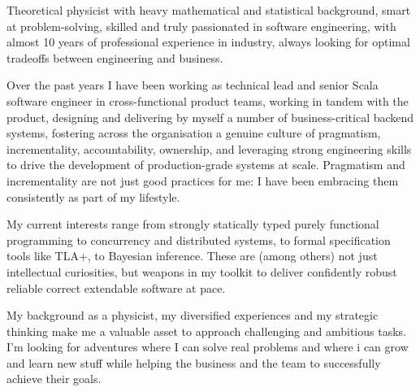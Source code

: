 
\begin{cvparagraph}
Theoretical physicist with heavy mathematical and statistical 
background, smart at problem-solving, skilled and truly passionated in software engineering, with almost 10 years of professional experience in industry, always looking for optimal tradeoffs between engineering and business.

  Over the past years I have been working as technical lead and senior Scala software engineer in cross-functional product teams, working in tandem with the product, designing and delivering by myself a number of business-critical backend systems, fostering  across the organisation a genuine culture of pragmatism, incrementality, accountability, ownership, and leveraging strong engineering skills 
  to drive the development of production-grade systems at scale. Pragmatism and incrementality are not just good practices for me: I have been embracing them consistently as part of my lifestyle.

  My current interests range from strongly statically typed purely functional programming to concurrency and distributed systems, to formal specification tools like TLA+, to Bayesian inference. These are (among others) not just intellectual curiosities, but weapons in my toolkit to deliver confidently robust reliable correct extendable software at pace. 

My background as a physicist, my diversified experiences and my strategic thinking make me a valuable asset to approach challenging and ambitious tasks. I'm looking for adventures where I can solve real problems and where i can grow and learn new stuff while helping the business and the team to successfully achieve their goals. 
\end{cvparagraph}
